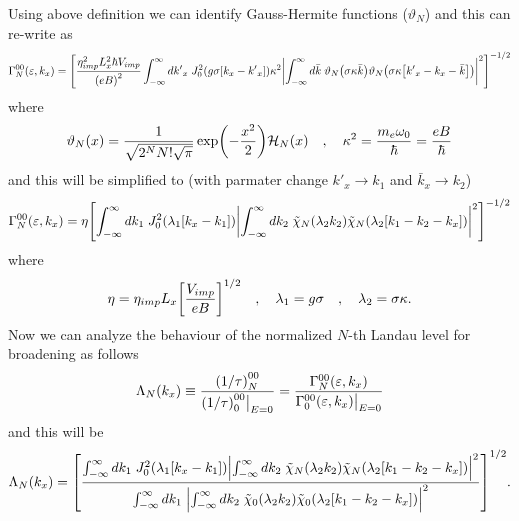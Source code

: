 \noindent
Using above definition we can identify Gauss-Hermite functions ($\vartheta_N$) and this can re-write as
\begin{equation} \label{5.11}
  \begin{aligned}
    \Gamma^{00}_{N}(\varepsilon,k_x)  =
    \qty[
    \frac { \eta_{imp}^2 L_x^2 \hbar V_{imp}}{\qty(eB)^2}
    \int_{-\infty}^{\infty} d {k'}_x \;
    J_0^2\qty(g\sigma[{k}_x - {k'}_x])
    \kappa^2
    \qty|
    \int_{-\infty}^{\infty} d\bar{k} \;
    \vartheta_{N}\qty(\sigma\kappa\bar{k})
    \vartheta_{N}\qty(\sigma\kappa\qty[{k'}_x - {k}_x - \bar{k}])|^2
    ]^{-1/2}
  \end{aligned}
\end{equation}
where
\begin{equation} \label{5.12}
  \vartheta_N(x) = \frac{1}{\sqrt{2^{N}N!\sqrt{\pi}}}
  \exp(-\frac{x^2}{2})
  \mathcal{H}_N\qty(x) \quad,\quad
  \kappa^2 = \frac{m_e\omega_0}{\hbar} = \frac{eB}{\hbar}
\end{equation}
and this will be simplified to (with parmater change $k'_x \rightarrow k_1$ and $\bar{k}_x \rightarrow k_2$)
\begin{equation} \label{5.13}
  \begin{aligned}
    \Gamma^{00}_{N}(\varepsilon,k_x)  =
    \eta
    \qty[
    \int_{-\infty}^{\infty} d {k}_1 \;
    J_0^2\qty(\lambda_1[{k}_x - {k}_1])
    \qty|
    \int_{-\infty}^{\infty} d{k}_2 \;
    \tilde{\chi}_{N}\qty(\lambda_2 k_2)
    \tilde{\chi}_{N}\qty(\lambda_2 \qty[{k}_1 - {k}_2 - {k}_x])|^2
    ]^{-1/2}
  \end{aligned}
\end{equation}
where
\begin{equation} \label{5.14}
    \eta = \eta_{imp} L_x \qty[\frac { V_{imp}}{eB}]^{1/2} \quad,\quad
    \lambda_1 = g\sigma \quad,\quad
    \lambda_2 = \sigma \kappa.
\end{equation}
\noindent
Now we can analyze the behaviour of the normalized $N$-th Landau level for broadening as follows
\begin{equation} \label{5.15}
    \Lambda_N(k_x) \equiv
    \frac{\qty(1/\tau)^{00}_{N}}{\qty(1/\tau)^{00}_{0}\big|_{E=0}} =
    \frac{\Gamma^{00}_{N}(\varepsilon,k_x)}{\Gamma^{00}_{0}(\varepsilon,k_x)\big|_{E=0}}
\end{equation}
and this will be
\begin{equation} \label{5.16}
    \Lambda_N (k_x) =
    \qty[
    \frac
    {\int_{-\infty}^{\infty} d {k}_1 \;
    J_0^2\qty(\lambda_1[{k}_x - {k}_1])
    \qty|
    \int_{-\infty}^{\infty} d{k}_2 \;
    \tilde{\chi}_{N}\qty(\lambda_2 k_2)
    \tilde{\chi}_{N}\qty(\lambda_2 \qty[{k}_1 - {k}_2 - {k}_x])|^2}
    {\int_{-\infty}^{\infty} d {k}_1 \;
    \qty|
    \int_{-\infty}^{\infty} d{k}_2 \;
    \tilde{\chi}_{0}\qty(\lambda_2 k_2)
    \tilde{\chi}_{0}\qty(\lambda_2 \qty[{k}_1 - {k}_2 - {k}_x])|^2}
    ]^{1/2}.
\end{equation}

